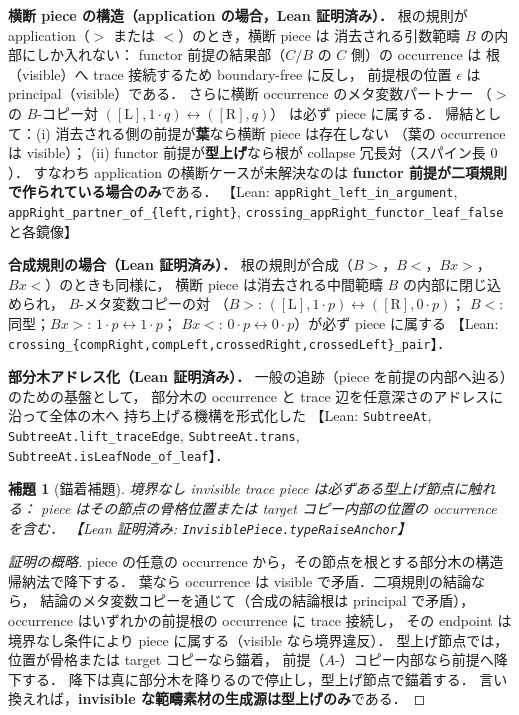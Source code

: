\documentclass[paper=a4,fontsize=10pt,jafontscale=0.92]{jlreq}
\theoremstyle{plain}
\newtheorem{lemma}[theorem]{補題}
\theoremstyle{definition}
\theoremstyle{remark}
\newcommand{\lean}[1]{\texttt{#1}}
\begin{document}
\medskip
\noindent\textbf{横断 piece の構造（application の場合，Lean 証明済み）．}
根の規則が application（$>$ または $<$）のとき，横断 piece は
消去される引数範疇 $B$ の内部にしか入れない：
functor 前提の結果部（$C/B$ の $C$ 側）の occurrence は
根（visible）へ trace 接続するため boundary-free に反し，
前提根の位置 $\epsilon$ は principal（visible）である．
さらに横断 occurrence のメタ変数パートナー
（$>$ の $B$-コピー対 $([\mathrm{L}], 1{\cdot}q) \leftrightarrow ([\mathrm{R}], q)$）
は必ず piece に属する．
帰結として：(i) 消去される側の前提が\textbf{葉}なら横断 piece は存在しない
（葉の occurrence は visible）；
(ii) functor 前提が\textbf{型上げ}なら根が collapse 冗長対（スパイン長 $0$）．
すなわち application の横断ケースが未解決なのは
\textbf{functor 前提が二項規則で作られている場合のみ}である．
【Lean: \lean{appRight\_left\_in\_argument},
\lean{appRight\_partner\_of\_\{left,right\}},
\lean{crossing\_appRight\_functor\_leaf\_false} と各鏡像】

\medskip
\noindent\textbf{合成規則の場合（Lean 証明済み）．}
根の規則が合成（$B{>}$，$B{<}$，$Bx{>}$，$Bx{<}$）のときも同様に，
横断 piece は消去される中間範疇 $B$ の内部に閉じ込められ，
$B$-メタ変数コピーの対
（$B{>}$: $([\mathrm{L}],1{\cdot}p)\leftrightarrow([\mathrm{R}],0{\cdot}p)$；
$B{<}$: 同型；$Bx{>}$: $1{\cdot}p\leftrightarrow 1{\cdot}p$；
$Bx{<}$: $0{\cdot}p\leftrightarrow 0{\cdot}p$）が必ず piece に属する
【Lean: \lean{crossing\_\{compRight,compLeft,crossedRight,crossedLeft\}\_pair}】．

\medskip
\noindent\textbf{部分木アドレス化（Lean 証明済み）．}
一般の追跡（piece を前提の内部へ辿る）のための基盤として，
部分木の occurrence と trace 辺を任意深さのアドレスに沿って全体の木へ
持ち上げる機構を形式化した
【Lean: \lean{SubtreeAt}, \lean{SubtreeAt.lift\_traceEdge},
\lean{SubtreeAt.trans}, \lean{SubtreeAt.isLeafNode\_of\_leaf}】．

\begin{lemma}[錨着補題]
\label{lem:anchor}
境界なし invisible trace piece は必ずある型上げ節点に触れる：
piece はその節点の骨格位置または target コピー内部の位置の occurrence を含む．
【Lean 証明済み: \lean{InvisiblePiece.typeRaiseAnchor}】
\end{lemma}

\begin{proof}[証明の概略]
piece の任意の occurrence から，その節点を根とする部分木の構造帰納法で降下する．
葉なら occurrence は visible で矛盾．二項規則の結論なら，
結論のメタ変数コピーを通じて（合成の結論根は principal で矛盾），
occurrence はいずれかの前提根の occurrence に trace 接続し，
その endpoint は境界なし条件により piece に属する（visible なら境界違反）．
型上げ節点では，位置が骨格または target コピーなら錨着，
前提（$A$-）コピー内部なら前提へ降下する．
降下は真に部分木を降りるので停止し，型上げ節点で錨着する．
言い換えれば，\textbf{invisible な範疇素材の生成源は型上げのみ}である．
\end{proof}
\end{document}
